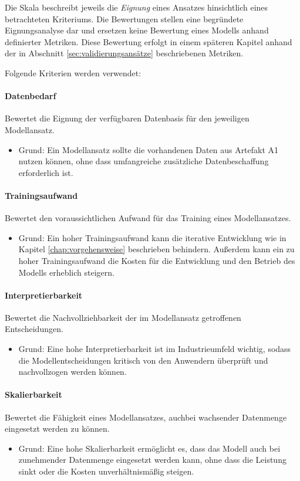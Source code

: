 Die Skala beschreibt jeweils die \textit{Eignung} eines Ansatzes hinsichtlich eines betrachteten Kriteriums. 
Die Bewertungen stellen eine begründete Eignungsanalyse dar und ersetzen keine Bewertung eines Modells anhand definierter Metriken. 
Diese Bewertung erfolgt in einem späteren Kapitel anhand der in Abschnitt \ref{sec:validierungsansätze} beschriebenen Metriken.

Folgende Kriterien werden verwendet: 

\paragraph{\textbf{Datenbedarf}} 
Bewertet die Eignung der verfügbaren Datenbasis für den jeweiligen Modellansatz. 
\begin{itemize}
    \item Grund: Ein Modellansatz sollte die vorhandenen Daten aus Artefakt A1 nutzen können, ohne dass umfangreiche zusätzliche Datenbeschaffung erforderlich ist.
\end{itemize}

\paragraph{\textbf{Trainingsaufwand}} 
Bewertet den voraussichtlichen Aufwand für das Training eines Modellansatzes. 
\begin{itemize}
    \item Grund: Ein hoher Trainingsaufwand kann die iterative Entwicklung wie in Kapitel \ref{chap:vorgehensweise} beschrieben behindern. Außerdem kann ein zu hoher Trainingsaufwand die Kosten für die Entwicklung und den Betrieb des Modells erheblich steigern.
\end{itemize}

\paragraph{\textbf{Interpretierbarkeit}} 
Bewertet die Nachvollziehbarkeit der im Modellansatz getroffenen Entscheidungen. 
\begin{itemize}
    \item Grund: Eine hohe Interpretierbarkeit ist im Industrieumfeld wichtig, sodass die Modellentscheidungen kritisch von den Anwendern überprüft und nachvollzogen werden können.
\end{itemize}

\paragraph{\textbf{Skalierbarkeit}}
Bewertet die Fähigkeit eines Modellansatzes, auchbei wachsender Datenmenge eingesetzt werden zu können.
\begin{itemize}
    \item Grund: Eine hohe Skalierbarkeit ermöglicht es, dass das Modell auch bei zunehmender Datenmenge eingesetzt werden kann, ohne dass die Leistung sinkt oder die Kosten unverhältnismäßig steigen.
\end{itemize}


